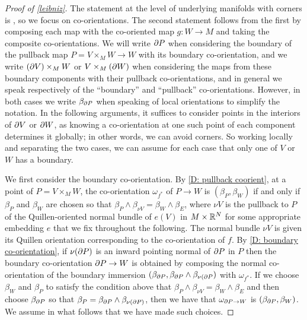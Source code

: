 \begin{proof}[Proof of \cref{leibniz}]
	The statement at the level of underlying manifolds with corners is \cite[Proposition 6.7]{Joy12}, so we focus on co-orientations.
	The second statement follows from the first by composing each map with the co-oriented map $g \colon W \to M$ and taking the composite co-orientations.
	We will write $\partial P$ when considering the boundary of the pullback map $P = V \times_M W \to W$ with its boundary co-orientation, and we write $(\partial V) \times_M W$ or $V \times_M (\partial W)$ when considering the maps from these boundary components with their pullback co-orientations, and in general we speak respectively of the ``boundary''  and ``pullback'' co-orientations.
	However, in both cases we write $\beta_{\partial P}$ when speaking of local orientations to simplify the notation.
	In the following arguments, it suffices to consider points in the interiors of $\partial V$ or $\partial W$, as knowing a co-orientation at one such point of each component determines it globally; in other words, we can avoid corners.
	So working locally and separating the two cases, we can assume for each case that only one of $V$ or $W$ has a boundary.

	We first consider the boundary co-orientation.
	By \cref{D: pullback coorient}, at a point of $P = V \times_M W$, the co-orientation $\omega_{f^*}$ of $P \to W$ is $(\beta_P,\beta_W)$ if and only if $\beta_P$ and $\beta_W$ are chosen so that $\beta_P \wedge \beta_{\nu V} = \beta_W \wedge \beta_E$, where $\nu V$ is the pullback to $P$ of the Quillen-oriented normal bundle of $e(V)$ in $M \times \mathbb{R}^N$ for some appropriate embedding $e$ that we fix throughout the following.
	The normal bundle $\nu V$ is given its Quillen orientation corresponding to the co-orientation of $f$.
	By \cref{D: boundary co-orientation}, if $\nu (\partial P)$ is an inward pointing normal of $\partial P$ in $P$ then the boundary co-orientation $\partial P \to W$ is obtained by composing the normal co-orientation of the boundary immersion $(\beta_{\partial P},\beta_{\partial P} \wedge \beta_{\nu (\partial P})$ with $\omega_{f^*}$.
	If we choose $\beta_W$ and $\beta_P$ to satisfy the condition above that  $\beta_P \wedge \beta_{\nu V} = \beta_W \wedge \beta_E$ and then choose $\beta_{\partial P}$ so that $\beta_P = \beta_{\partial P} \wedge \beta_{\nu(\partial P)}$, then we have that $\omega_{\partial P \to W}$ is $(\beta_{\partial P},\beta_W)$.
	We assume in what follows that we have made such choices.


\end{proof}
